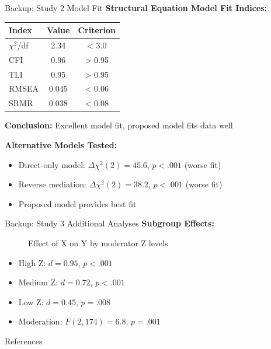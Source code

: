 \documentclass[aspectratio=169,12pt]{beamer}
\begin{document}
\begin{frame}{Backup: Study 2 Model Fit}
  \textbf{Structural Equation Model Fit Indices:}
  
  \begin{table}
    \centering
    \begin{tabular}{lcc}
      \toprule
      \textbf{Index} & \textbf{Value} & \textbf{Criterion} \\
      \midrule
      $\chi^2$/df & 2.34 & < 3.0 \\
      CFI & 0.96 & > 0.95 \\
      TLI & 0.95 & > 0.95 \\
      RMSEA & 0.045 & < 0.06 \\
      SRMR & 0.038 & < 0.08 \\
      \bottomrule
    \end{tabular}
  \end{table}
  
  \vspace{0.5cm}
  
  \textbf{Conclusion:} Excellent model fit, proposed model fits data well
  
  \vspace{0.5cm}
  
  \textbf{Alternative Models Tested:}
  \begin{itemize}
    \item Direct-only model: $\Delta\chi^2(2) = 45.6$, $p < .001$ (worse fit)
    \item Reverse mediation: $\Delta\chi^2(2) = 38.2$, $p < .001$ (worse fit)
    \item Proposed model provides best fit
  \end{itemize}
\end{frame}

\begin{frame}{Backup: Study 3 Additional Analyses}
  \textbf{Subgroup Effects:}
  
  \begin{figure}
    \centering
    \caption{Effect of X on Y by moderator Z levels}
  \end{figure}
  
  \begin{itemize}
    \item High Z: $d = 0.95$, $p < .001$
    \item Medium Z: $d = 0.72$, $p < .001$
    \item Low Z: $d = 0.45$, $p = .008$
    \item Moderation: $F(2,174) = 6.8$, $p = .001$
  \end{itemize}
\end{frame}


\begin{frame}[allowframebreaks]{References}
  \printbibliography
\end{frame}
\end{document}
